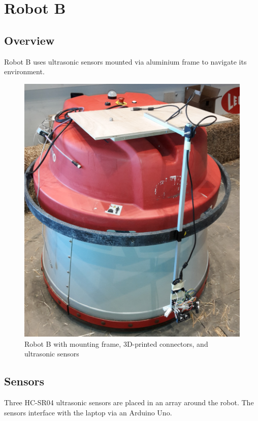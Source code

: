 \documentclass[11pt]{article}
\begin{document}
	
	
	\pagebreak

	\section{Robot B}
	
	\subsection{Overview}
	Robot B uses ultrasonic sensors mounted via aluminium frame to navigate its environment.
	
	\begin{figure}[h]
		\centering
		\includegraphics[scale=0.1]{robot_b_full}
		\caption{Robot B with mounting frame, 3D-printed connectors, and ultrasonic sensors}
	\end{figure}
	
	\subsection{Sensors}
	Three HC-SR04 ultrasonic sensors are placed in an array around the robot. The sensors interface with the laptop via an Arduino Uno.
	
\end{document}
